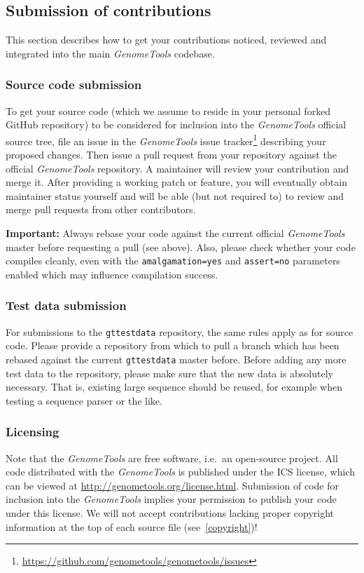 \documentclass[11pt,final]{article}
\newcommand{\keyword}[1]{\lstinline{#1}}
\newcommand{\Gt}[0]{\emph{GenomeTools}\xspace}
\begin{document}
\subsection{Submission of contributions}

This section describes how to get your contributions noticed, reviewed and
integrated into the main \Gt codebase.

\subsubsection{Source code submission}

To get your source code (which we assume to reside in your personal forked
GitHub repository) to be considered for inclusion into the \Gt official source
tree, file an issue in the \Gt issue
tracker\footnote{\url{https://github.com/genometools/genometools/issues}}
describing your proposed changes. Then issue a pull request from your repository against the official \Gt repository. A maintainer will review your contribution and merge it. After providing a working patch or feature, you will eventually obtain maintainer status yourself and will be able (but not required to) to review and merge pull requests from other contributors.

\textbf{Important:} Always rebase your code against the current
official \Gt master before requesting a pull (see above). Also, please check
whether your code compiles cleanly, even with the \keyword{amalgamation=yes}
and \keyword{assert=no} parameters enabled which may influence compilation
success.

\subsubsection{Test data submission}

For submissions to the \keyword{gttestdata} repository, the same rules apply
as for source code. Please provide a repository from which to pull a branch
which has been rebased against the current \keyword{gttestdata} master before.
Before adding any more test data to the repository, please make sure that
the new data is absolutely necessary. That is, existing large sequence should be
reused, for example when testing a sequence parser or the like.

\subsubsection{Licensing}

Note that the \Gt are free software, i.e.\ an open-source project.
All code distributed with the \Gt is published under the ICS license,
which can be viewed at \url{http://genometools.org/license.html}. Submission of
code for inclusion into the \Gt implies your permission to publish your code
under this license. We will not accept contributions lacking proper
copyright information at the top of each source file (see~\ref{copyright})!
\end{document}
